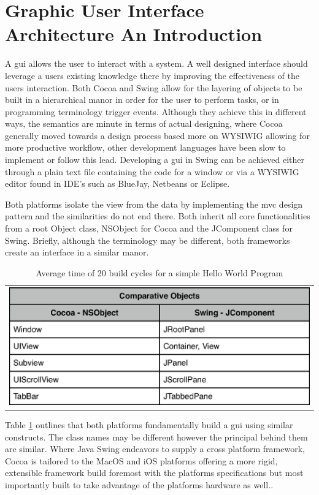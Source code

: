 \documentclass[a4paper,14pt]{article}
\begin{document}
\section{Graphic User Interface Architecture An Introduction} %
\label{sec:graphic_user_interface_architecture}
A \gls{gui} allows the user to interact with a system. A well designed interface should leverage a users existing knowledge there by improving the effectiveness of the users interaction. Both Cocoa and Swing allow for the layering of objects to be built in a hierarchical manor in order for the user to perform tasks, or in programming terminology trigger events. Although they achieve this in different ways, the semantics are minute in terms of actual designing, where Cocoa generally moved towards a design process based more on WYSIWIG allowing for more productive workflow, other development languages have been slow to implement or follow this lead. Developing a \gls{gui} in Swing can be achieved either through a plain text file containing the code for a window or via a WYSIWIG editor found in IDE's such as BlueJay, Netbeans or Eclipse.

Both platforms isolate the view from the data by implementing the \gls{mvc} design pattern and the similarities do not end there. Both inherit all core functionalities from a root Object class, NSObject for Cocoa and the JComponent class for Swing. Briefly, although the terminology may be different, both frameworks create an interface in a similar manor.


\begin{table}[H]
\centering
\begin{tabular}{l}
\includegraphics[scale=1.0]{tableSimilarClasses.eps}
\end{tabular}
\caption{Average time of 20 build cycles for a simple Hello World Program}
\label{table:tableSimilarClasses}
\end{table}


Table \ref{table:tableSimilarClasses} outlines that both platforms fundamentally build a \gls{gui} using similar constructs. The class names may be different however the principal behind them are similar. Where Java Swing endeavors to supply a cross platform framework, Cocoa is tailored to the MacOS and iOS platforms offering a more rigid, extensible framework build foremost with the platforms specifications but most importantly built to take advantage of the platforms hardware as well.. 
\end{document}
